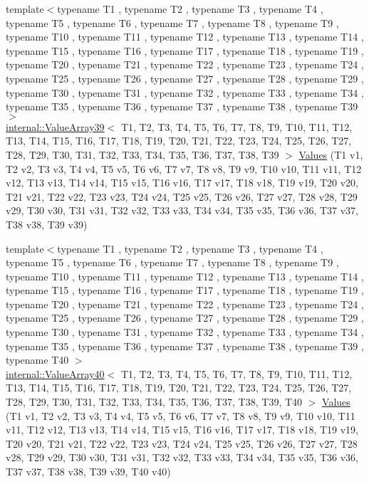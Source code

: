 \begin{DoxyCompactItemize}
\item 
{\footnotesize template$<$typename T1 , typename T2 , typename T3 , typename T4 , typename T5 , typename T6 , typename T7 , typename T8 , typename T9 , typename T10 , typename T11 , typename T12 , typename T13 , typename T14 , typename T15 , typename T16 , typename T17 , typename T18 , typename T19 , typename T20 , typename T21 , typename T22 , typename T23 , typename T24 , typename T25 , typename T26 , typename T27 , typename T28 , typename T29 , typename T30 , typename T31 , typename T32 , typename T33 , typename T34 , typename T35 , typename T36 , typename T37 , typename T38 , typename T39 $>$ }\\\mbox{\hyperlink{classtesting_1_1internal_1_1ValueArray39}{internal\+::\+Value\+Array39}}$<$ T1, T2, T3, T4, T5, T6, T7, T8, T9, T10, T11, T12, T13, T14, T15, T16, T17, T18, T19, T20, T21, T22, T23, T24, T25, T26, T27, T28, T29, T30, T31, T32, T33, T34, T35, T36, T37, T38, T39 $>$ \mbox{\hyperlink{namespacetesting_aba3a6a2dcb9660c6ccb1d867c7a137ee}{Values}} (T1 v1, T2 v2, T3 v3, T4 v4, T5 v5, T6 v6, T7 v7, T8 v8, T9 v9, T10 v10, T11 v11, T12 v12, T13 v13, T14 v14, T15 v15, T16 v16, T17 v17, T18 v18, T19 v19, T20 v20, T21 v21, T22 v22, T23 v23, T24 v24, T25 v25, T26 v26, T27 v27, T28 v28, T29 v29, T30 v30, T31 v31, T32 v32, T33 v33, T34 v34, T35 v35, T36 v36, T37 v37, T38 v38, T39 v39)
\item 
{\footnotesize template$<$typename T1 , typename T2 , typename T3 , typename T4 , typename T5 , typename T6 , typename T7 , typename T8 , typename T9 , typename T10 , typename T11 , typename T12 , typename T13 , typename T14 , typename T15 , typename T16 , typename T17 , typename T18 , typename T19 , typename T20 , typename T21 , typename T22 , typename T23 , typename T24 , typename T25 , typename T26 , typename T27 , typename T28 , typename T29 , typename T30 , typename T31 , typename T32 , typename T33 , typename T34 , typename T35 , typename T36 , typename T37 , typename T38 , typename T39 , typename T40 $>$ }\\\mbox{\hyperlink{classtesting_1_1internal_1_1ValueArray40}{internal\+::\+Value\+Array40}}$<$ T1, T2, T3, T4, T5, T6, T7, T8, T9, T10, T11, T12, T13, T14, T15, T16, T17, T18, T19, T20, T21, T22, T23, T24, T25, T26, T27, T28, T29, T30, T31, T32, T33, T34, T35, T36, T37, T38, T39, T40 $>$ \mbox{\hyperlink{namespacetesting_adaa8b96d44c103a70e5c4a4b3430ef4d}{Values}} (T1 v1, T2 v2, T3 v3, T4 v4, T5 v5, T6 v6, T7 v7, T8 v8, T9 v9, T10 v10, T11 v11, T12 v12, T13 v13, T14 v14, T15 v15, T16 v16, T17 v17, T18 v18, T19 v19, T20 v20, T21 v21, T22 v22, T23 v23, T24 v24, T25 v25, T26 v26, T27 v27, T28 v28, T29 v29, T30 v30, T31 v31, T32 v32, T33 v33, T34 v34, T35 v35, T36 v36, T37 v37, T38 v38, T39 v39, T40 v40)

\end{DoxyCompactItemize}
